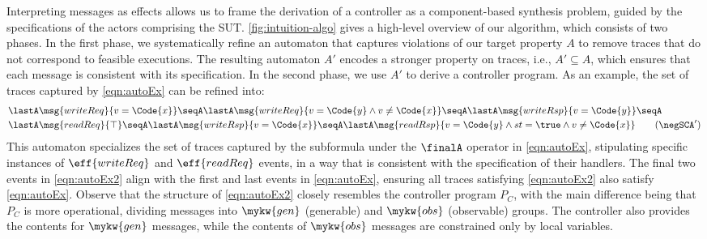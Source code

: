 
Interpreting messages as effects allows us to frame the derivation of
a controller as a component-based synthesis problem, guided by the
\PAT{} specifications of the actors comprising the
SUT. \autoref{fig:intuition-algo} gives a high-level overview of our
algorithm, which consists of two phases. In the first phase, we
systematically refine an automaton that captures violations of our
target property $A$ to remove traces that do not correspond to
feasible executions. The resulting automaton $A'$ encodes a stronger
property on traces, i.e., $A' \subseteq A$, which ensures that each
message is consistent with its specification. In the second phase, we
use $A'$ to derive a controller program. As an example, the set of
traces captured by \ref{eqn:autoEx} can be refined into: %
{\footnotesize
  \begin{align*}
  &\lastA \msg{writeReq}{v = \Code{x}} \seqA
   \lastA \msg{writeReq}{v =\Code{y} \land v \not=\Code{x}} \seqA \lastA \msg{writeRsp}{v = \Code{y}} \seqA \\
    &\lastA \msg{readReq}{\top} \seqA
    \lastA \msg{writeRsp}{v = \Code{x}} \seqA
    \lastA \msg{readRsp}{v = \Code{y} \land st = \true \land v \not=
    \Code{x}}
    \label{eqn:autoEx2}\tag{$\negSCA'$}
  \end{align*}}\noindent
This automaton specializes the set of traces captured by the
subformula under the $\finalA$ operator in \ref{eqn:autoEx},
stipulating specific instances of $\eff{writeReq}$ and $\eff{readReq}$
events, in a way that is consistent with the specification of their
handlers. The final two events in \ref{eqn:autoEx2} align with the
first and last events in \ref{eqn:autoEx}, ensuring all traces
satisfying \ref{eqn:autoEx2} also satisfy \ref{eqn:autoEx}.  Observe
that the structure of \ref{eqn:autoEx2} closely resembles the
controller program $P_{C}$, with the main difference being that
$P_{C}$ is more operational, dividing messages into $\mykw{gen}$
(generable) and $\mykw{obs}$ (observable) groups. The controller also
provides the contents for $\mykw{gen}$ messages, while the contents of
$\mykw{obs}$ messages are constrained only by local variables.



